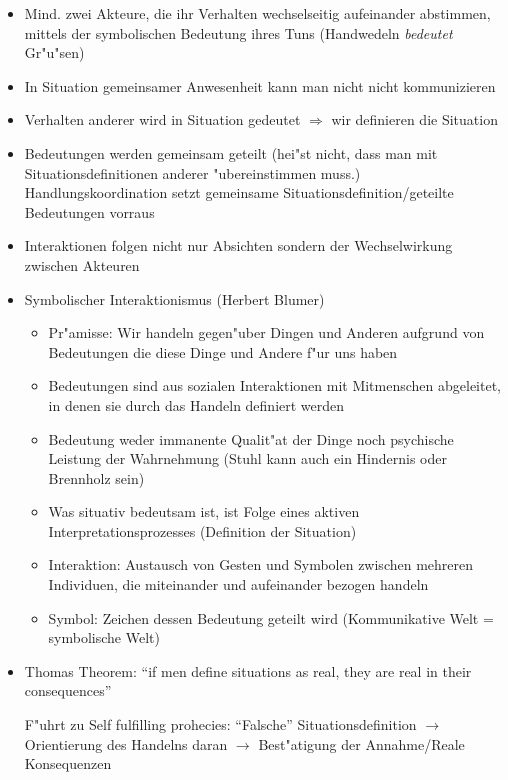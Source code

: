 \documentclass[a4paper, 12pt]{scrartcl}
\begin{document}
\begin{itemize}
	\item
		Mind. zwei Akteure, die ihr Verhalten wechselseitig aufeinander abstimmen, mittels der symbolischen Bedeutung ihres Tuns (Handwedeln \textit{bedeutet} Gr"u"sen)
	\item
		In Situation gemeinsamer Anwesenheit kann man nicht nicht kommunizieren
	\item
		Verhalten anderer wird in Situation gedeutet $\Rightarrow$ wir definieren die Situation
	\item
		Bedeutungen werden gemeinsam geteilt (hei"st nicht, dass man mit Situationsdefinitionen anderer "ubereinstimmen muss.) Handlungskoordination setzt gemeinsame Situationsdefinition/geteilte Bedeutungen vorraus
	\item
		Interaktionen folgen nicht nur Absichten sondern der Wechselwirkung zwischen Akteuren
	\item
		Symbolischer Interaktionismus (Herbert Blumer) 
		\begin{itemize}
			\item
				Pr"amisse: Wir handeln gegen"uber Dingen und Anderen aufgrund von Bedeutungen die diese Dinge und Andere f"ur uns haben
			\item
				Bedeutungen sind aus sozialen Interaktionen mit Mitmenschen abgeleitet, in denen sie durch das Handeln definiert werden
			\item
				Bedeutung weder immanente Qualit"at der Dinge noch psychische Leistung der Wahrnehmung (Stuhl kann auch ein Hindernis oder Brennholz sein)
			\item
				Was situativ bedeutsam ist, ist Folge eines aktiven Interpretationsprozesses (Definition der Situation)
			\item
				Interaktion: Austausch von Gesten und Symbolen zwischen mehreren Individuen, die miteinander und aufeinander bezogen handeln
			\item
				Symbol: Zeichen dessen Bedeutung geteilt wird (Kommunikative Welt = symbolische Welt)
		\end{itemize}

	\item
		Thomas Theorem: \enquote{if men define situations as real, they are real in their consequences} 

				F"uhrt zu Self fulfilling prohecies: \enquote{Falsche} Situationsdefinition $\rightarrow$ Orientierung des Handelns daran $\rightarrow$ Best"atigung der Annahme/Reale Konsequenzen
\end{itemize}
\end{document}
